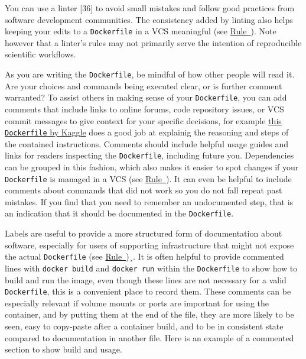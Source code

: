 \documentclass[10pt,letterpaper]{article}
\begin{document}
You can use a linter {[}36{]} to avoid small mistakes and follow good
practices from software development communities. The consistency added
by linting also helps keeping your edits to a \texttt{Dockerfile} in a
VCS meaningful (see
\hyperref[{rule:publish}]{Rule~}). Note however
that a linter's rules may not primarily serve the intention of
reproducible scientific workflows.

As you are writing the \texttt{Dockerfile}, be mindful of how other
people will read it. Are your choices and commands being executed clear,
or is further comment warranted? To assist others in making sense of
your \texttt{Dockerfile}, you can add comments that include links to
online forums, code repository issues, or VCS commit messages to give
context for your specific decisions, for example
\href{https://github.com/Kaggle/docker-rstats/blob/master/Dockerfile}{this
\texttt{Dockerfile} by Kaggle} does a good job at explainig the
reasoning and steps of the contained instructions. Comments should
include helpful usage guides and links for readers inspecting the
\texttt{Dockerfile}, including future you. Dependencies can be grouped
in this fashion, which also makes it easier to spot changes if your
\texttt{Dockerfile} is managed in a VCS (see
\hyperref[{rule:publish}]{Rule~}). It can even
be helpful to include comments about commands that did not work so you
do not fall repeat past mistakes. If you find that you need to remember
an undocumented step, that is an indication that it should be documented
in the \texttt{Dockerfile}.

Labels are useful to provide a more structured form of documentation
about software, especially for users of supporting infrastructure that
might not expose the actual \texttt{Dockerfile} (see
\hyperref[{rule:metadata}]{Rule~})¸. It is
often helpful to provide commented lines with \texttt{docker\ build} and
\texttt{docker\ run} within the \texttt{Dockerfile} to show how to build
and run the image, even though these lines are not necessary for a valid
\texttt{Dockerfile}, this is a convenient place to record them. These
comments can be especially relevant if volume mounts or ports are
important for using the container, and by putting them at the end of the
file, they are more likely to be seen, easy to copy-paste after a
container build, and to be in consistent state compared to documentation
in another file. Here is an example of a commented section to show build
and usage.
\end{document}
